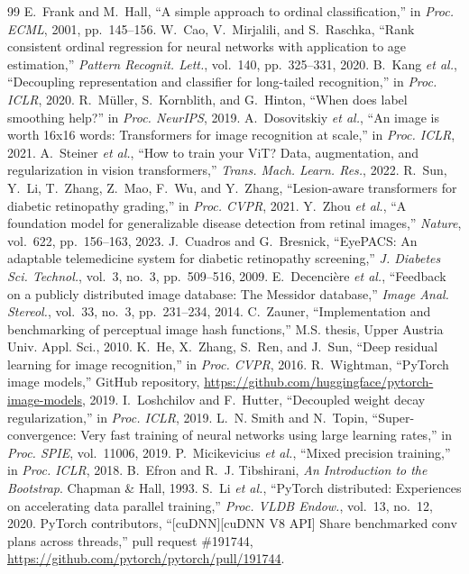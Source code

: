 \documentclass[conference,a4paper]{IEEEtran}
\begin{document}
\begin{thebibliography}{99}
 E.~Frank and M.~Hall, ``A simple approach to ordinal classification,'' in \emph{Proc. ECML}, 2001, pp.~145--156.
 W.~Cao, V.~Mirjalili, and S.~Raschka, ``Rank consistent ordinal regression for neural networks with application to age estimation,'' \emph{Pattern Recognit. Lett.}, vol.~140, pp.~325--331, 2020.
 B.~Kang \emph{et al.}, ``Decoupling representation and classifier for long-tailed recognition,'' in \emph{Proc. ICLR}, 2020.
 R.~M{\"u}ller, S.~Kornblith, and G.~Hinton, ``When does label smoothing help?'' in \emph{Proc. NeurIPS}, 2019.
 A.~Dosovitskiy \emph{et al.}, ``An image is worth 16x16 words: Transformers for image recognition at scale,'' in \emph{Proc. ICLR}, 2021.
 A.~Steiner \emph{et al.}, ``How to train your ViT? Data, augmentation, and regularization in vision transformers,'' \emph{Trans. Mach. Learn. Res.}, 2022.
 R.~Sun, Y.~Li, T.~Zhang, Z.~Mao, F.~Wu, and Y.~Zhang, ``Lesion-aware transformers for diabetic retinopathy grading,'' in \emph{Proc. CVPR}, 2021.
 Y.~Zhou \emph{et al.}, ``A foundation model for generalizable disease detection from retinal images,'' \emph{Nature}, vol.~622, pp.~156--163, 2023.
 J.~Cuadros and G.~Bresnick, ``EyePACS: An adaptable telemedicine system for diabetic retinopathy screening,'' \emph{J. Diabetes Sci. Technol.}, vol.~3, no.~3, pp.~509--516, 2009.
 E.~Decenci\`ere \emph{et al.}, ``Feedback on a publicly distributed image database: The Messidor database,'' \emph{Image Anal. Stereol.}, vol.~33, no.~3, pp.~231--234, 2014.
 C.~Zauner, ``Implementation and benchmarking of perceptual image hash functions,'' M.S. thesis, Upper Austria Univ. Appl. Sci., 2010.
 K.~He, X.~Zhang, S.~Ren, and J.~Sun, ``Deep residual learning for image recognition,'' in \emph{Proc. CVPR}, 2016.
 R.~Wightman, ``PyTorch image models,'' GitHub repository, \url{https://github.com/huggingface/pytorch-image-models}, 2019.
 I.~Loshchilov and F.~Hutter, ``Decoupled weight decay regularization,'' in \emph{Proc. ICLR}, 2019.
 L.~N. Smith and N.~Topin, ``Super-convergence: Very fast training of neural networks using large learning rates,'' in \emph{Proc. SPIE}, vol.~11006, 2019.
 P.~Micikevicius \emph{et al.}, ``Mixed precision training,'' in \emph{Proc. ICLR}, 2018.
 B.~Efron and R.~J. Tibshirani, \emph{An Introduction to the Bootstrap}. Chapman \& Hall, 1993.
 S.~Li \emph{et al.}, ``PyTorch distributed: Experiences on accelerating data parallel training,'' \emph{Proc. VLDB Endow.}, vol.~13, no.~12, 2020.
 PyTorch contributors, ``[cuDNN][cuDNN V8 API] Share benchmarked conv plans across threads,'' pull request \#191744, \url{https://github.com/pytorch/pytorch/pull/191744}.
\end{thebibliography}
\end{document}
